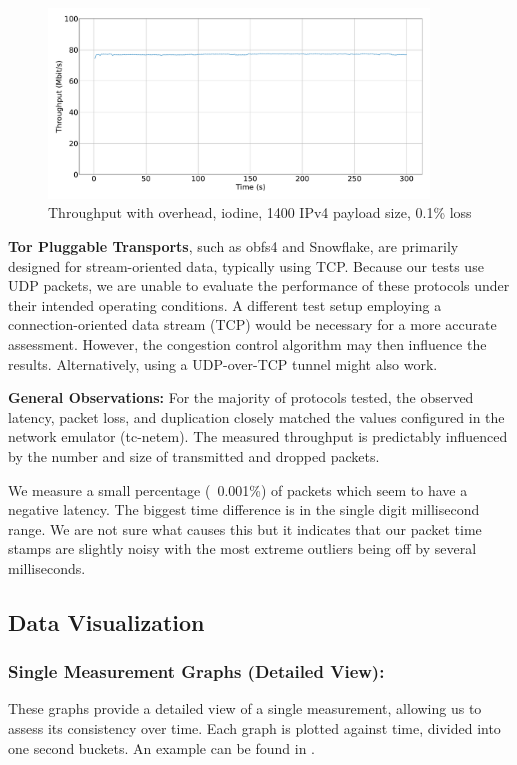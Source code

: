 \begin{figure}[tbh]
	\centering
	\includegraphics[draft=false,width=0.9\textwidth]{figures/Graphs/graph-5-iodine-constant-throughput/throughput.pdf}
	\caption{Throughput with overhead, iodine, 1400 IPv4 payload size, 0.1\% loss}
	\label{fig:graph-5-iodine-constant-throughput}
\end{figure}


\textbf{Tor Pluggable Transports}, such as obfs4 and Snowflake, are primarily designed for stream-oriented data, typically using TCP.
Because our tests use UDP packets, we are unable to evaluate the performance of these protocols under their intended operating conditions.
A different test setup employing a connection-oriented data stream (TCP) would be necessary for a more accurate assessment.
However, the congestion control algorithm may then influence the results.
Alternatively, using a UDP-over-TCP tunnel might also work.


\noindent\textbf{General Observations:}
For the majority of protocols tested, the observed latency, packet loss, and duplication closely matched the values configured in the network emulator (tc-netem).
The measured throughput is predictably influenced by the number and size of transmitted and dropped packets.

We measure a small percentage (~0.001\%) of packets which seem to have a negative latency.
The biggest time difference is in the single digit millisecond range.
We are not sure what causes this but it indicates that our packet time stamps are slightly noisy with the most extreme outliers being off by several milliseconds.


\subsection{Data Visualization}
\subsubsection{Single Measurement Graphs (Detailed View):}
\label{sect:graphs-single}
These graphs provide a detailed view of a single measurement, allowing us to assess its consistency over time.
Each graph is plotted against time, divided into one second buckets.
An example can be found in .

